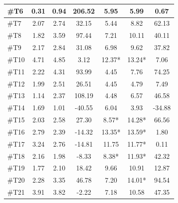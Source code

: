 \begin{longtable} {l|c|c|c|c|c|c}
\#T6 & 0.31 & 0.94   & 206.52 & 5.95 & 5.99 & 0.67 \\ \hline
\#T7 & 2.07 & 2.74  & 32.15 & 5.44 & 8.82 & 62.13 \\ \hline
\#T8 & 1.82 & 3.59 & 97.44 & 7.21 & 10.11 & 40.11 \\ \hline
\#T9 & 2.17 & 2.84  & 31.08 & 6.98 & 9.62 & 37.82 \\ \hline
\#T10 & 4.71 & 4.85  & 3.12 & 12.37*  & 13.24* & 7.06 \\ \hline
\#T11 & 2.22 & 4.31 & 93.99 & 4.45 & 7.76 & 74.25 \\ \hline
\#T12 & 1.99 & 2.51 & 26.51 & 4.45 & 4.79 & 7.49 \\ \hline
\#T13 & 1.14 & 2.37 & 108.19 & 4.48 & 6.57 & 46.58 \\ \hline
\#T14 & 1.69 & 1.01 & -40.55 & 6.04 & 3.93 & -34.88 \\ \hline
\#T15 & 2.03 & 2.58 & 27.30 & 8.57* & 14.28* & 66.56 \\ \hline
\#T16 & 2.79 & 2.39 & -14.32 & 13.35* & 13.59* & 1.80 \\ \hline
\#T17 & 3.24 & 2.76 & -14.81 & 11.75 & 11.77* & 0.11 \\ \hline
\#T18 & 2.16 & 1.98 & -8.33 & 8.38* & 11.93* & 42.32 \\ \hline
\#T19 & 1.77 & 2.10 & 18.42 & 9.66 & 10.91 & 12.87  \\ \hline
\#T20 & 2.28 & 3.35 & 46.78 & 7.20  & 14.01* & 94.54 \\ \hline
\#T21 & 3.91 &  3.82 & -2.22 & 7.18 & 10.58 & 47.35 \\ \hline
\end{longtable}


